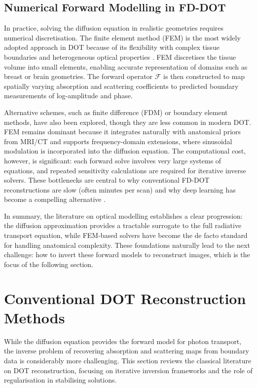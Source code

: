 \subsection{Numerical Forward Modelling in FD-DOT}
In practice, solving the diffusion equation in realistic geometries requires numerical discretisation. The finite element method (FEM) is the most widely adopted approach in DOT because of its flexibility with complex tissue boundaries and heterogeneous optical properties \cite{dehghani2009}. FEM discretises the tissue volume into small elements, enabling accurate representation of domains such as breast or brain geometries. The forward operator $\mathcal{F}$ is then constructed to map spatially varying absorption and scattering coefficients to predicted boundary measurements of log-amplitude and phase. 

Alternative schemes, such as finite difference (FDM) or boundary element methods, have also been explored, though they are less common in modern DOT. FEM remains dominant because it integrates naturally with anatomical priors from MRI/CT and supports frequency-domain extensions, where sinusoidal modulation is incorporated into the diffusion equation. The computational cost, however, is significant: each forward solve involves very large systems of equations, and repeated sensitivity calculations are required for iterative inverse solvers. These bottlenecks are central to why conventional FD-DOT reconstructions are slow (often minutes per scan) and why deep learning has become a compelling alternative \cite{arridge2009, dehghani2009}. 

In summary, the literature on optical modelling establishes a clear progression: the diffusion approximation provides a tractable surrogate to the full radiative transport equation, while FEM-based solvers have become the de facto standard for handling anatomical complexity. These foundations naturally lead to the next challenge: how to invert these forward models to reconstruct images, which is the focus of the following section.

\section{Conventional DOT Reconstruction Methods}
While the diffusion equation provides the forward model for photon transport, the inverse problem of recovering absorption and scattering maps from boundary data is considerably more challenging. This section reviews the classical literature on DOT reconstruction, focusing on iterative inversion frameworks and the role of regularisation in stabilising solutions.

